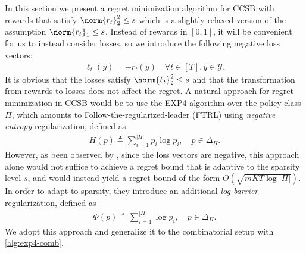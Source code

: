 \documentclass[11pt]{article}
\newcommand{\eqdef}{\triangleq}
\newcommand{\rew}{r}
\newcommand{\lab}{y}
\newcommand{\calY}{\mathcal{Y}}
\theoremstyle{plain}
\begin{document}
In this section we present a regret minimization algorithm for CCSB with rewards that satisfy $\norm{\rew_t}_2^2 \leq s$ which is a slightly relaxed version of the assumption $\norm{\rew_t}_1 \leq s$. Instead of rewards in $[0,1]$, it will be convenient for us to instead consider losses, so we introduce the following negative loss vectors:
\begin{align*}
    \ell_t(\lab) = - \rew_t(\lab) \quad \forall t \in [T], \lab \in \calY.
\end{align*}
It is obvious that the losses satisfy $\norm{\ell_t}_2^2 \leq s$ and that the transformation from rewards to losses does not affect the regret. A natural approach for regret minimization in CCSB would be to use the EXP4 algorithm \citep{auer2002nonstochastic} over the policy class $\Pi$, which amounts to Follow-the-regularized-leader (FTRL) using \emph{negative entropy} regularization, defined as
\begin{align}
\label{eqn:entropy}
    H(p) \eqdef \sum_{i=1}^{|\Pi|} p_i \log p_i, \quad p \in \Delta_\Pi.
\end{align}
However, as been observed by \cite{erez2024real}, since the loss vectors are negative, this approach alone would not suffice to achieve a regret bound that is adaptive to the sparsity level $s$, and would instead yield a regret bound of the form $O(\sqrt{mKT \log |\Pi|})$. In order to adapt to sparsity, they introduce an additional \emph{log-barrier} regularization, defined as
\begin{align}
\label{eqn:log-bar}
    \Phi(p) \eqdef \sum_{i=1}^{|\Pi|} \log p_i, \quad p \in \Delta_\Pi.
\end{align}
We adopt this approach and generalize it to the combinatorial setup with \cref{alg:exp4-comb}.
\end{document}
